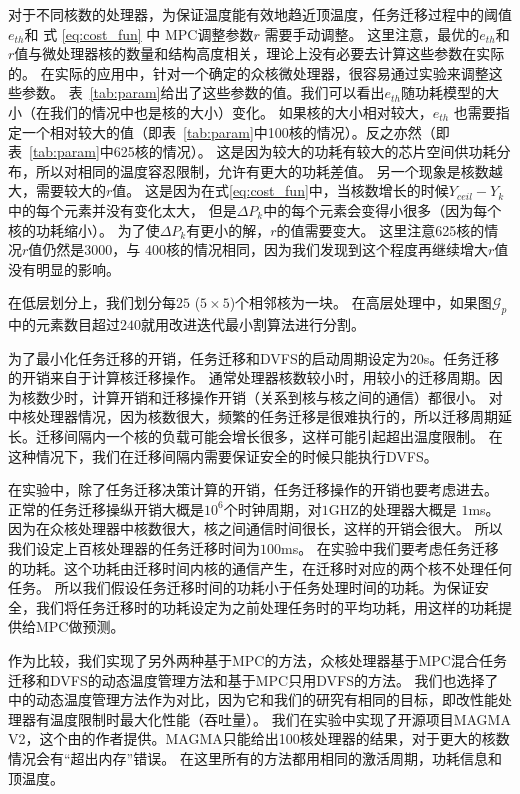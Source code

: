 对于不同核数的处理器，为保证温度能有效地趋近顶温度，任务迁移过程中的阈值$e_{th}$和 式 \eqref{eq:cost_fun} 中 MPC调整参数$r$ 需要手动调整。
这里注意，最优的$e_{th}$和$r$值与微处理器核的数量和结构高度相关，理论上没有必要去计算这些参数在实际的。
在实际的应用中，针对一个确定的众核微处理器，很容易通过实验来调整这些参数。
表~\ref{tab:param}给出了这些参数的值。我们可以看出$e_{th}$随功耗模型的大小（在我们的情况中也是核的大小）变化。
如果核的大小相对较大，$e_{th}$ 也需要指定一个相对较大的值（即表~\ref{tab:param}中100核的情况）。反之亦然（即表~\ref{tab:param}中625核的情况）。
这是因为较大的功耗有较大的芯片空间供功耗分布，所以对相同的温度容忍限制，允许有更大的功耗差值。
另一个现象是核数越大，需要较大的$r$值。
这是因为在式\eqref{eq:cost_fun}中，当核数增长的时候$Y_{ceil}-Y_k$ 中的每个元素并没有变化太大，
但是$\Delta P_k$中的每个元素会变得小很多（因为每个核的功耗缩小）。
为了使$\Delta P_k$有更小的解，$r$的值需要变大。
这里注意625核的情况$r$值仍然是$3000$，与 $400$核的情况相同，因为我们发现到这个程度再继续增大$r$值没有明显的影响。

在低层划分上，我们划分每$25$ ($5 \times 5$)个相邻核为一块。
在高层处理中，如果图$\mathcal{G}_p$中的元素数目超过$240$就用改进迭代最小割算法进行分割。

为了最小化任务迁移的开销，任务迁移和DVFS的启动周期设定为$20$s。任务迁移的开销来自于计算核迁移操作。
通常处理器核数较小时，用较小的迁移周期。因为核数少时，计算开销和迁移操作开销（关系到核与核之间的通信）都很小。
对中核处理器情况，因为核数很大，频繁的任务迁移是很难执行的，所以迁移周期延长。迁移间隔内一个核的负载可能会增长很多，这样可能引起超出温度限制。
在这种情况下，我们在迁移间隔内需要保证安全的时候只能执行DVFS。

在实验中，除了任务迁移决策计算的开销，任务迁移操作的开销也要考虑进去。
正常的任务迁移操纵开销大概是$10^6$个时钟周期，对$1$GHZ的处理器大概是 $1$ms\cite{Cuesta:ISVLSI'10}。
因为在众核处理器中核数很大，核之间通信时间很长，这样的开销会很大。
所以我们设定上百核处理器的任务迁移时间为$100$ms。
在实验中我们要考虑任务迁移的功耗。这个功耗由迁移时间内核的通信产生，在迁移时对应的两个核不处理任何任务。
所以我们假设任务迁移时间的功耗小于任务处理时间的功耗。为保证安全，我们将任务迁移时的功耗设定为之前处理任务时的平均功耗，用这样的功耗提供给MPC做预测。

作为比较，我们实现了另外两种基于MPC的方法，众核处理器基于MPC混合任务迁移和DVFS的动态温度管理方法\cite{MaWang:APCCAS'14}和基于MPC只用DVFS的方法。
我们也选择了\cite{Hanumaiah:TCAD'11}中的动态温度管理方法作为对比，因为它和我们的研究有相同的目标，即改性能处理器有温度限制时最大化性能（吞吐量）。
我们在实验中实现了开源项目MAGMA V2，这个由\cite{Hanumaiah:TCAD'11}的作者提供。MAGMA只能给出100核处理器的结果，对于更大的核数情况会有“超出内存”错误。
在这里所有的方法都用相同的激活周期，功耗信息和顶温度。

